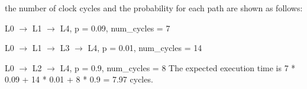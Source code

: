 \begin{problem}
\begin{enumerate}
{\begin{center}
	\end{center}

	the number of clock cycles and the probability for each path are shown as follows:
\item L0 $\rightarrow$ L1 $\rightarrow$ L4, p = 0.09, num\_cycles = 7
\item L0 $\rightarrow$ L1 $\rightarrow$ L3 $\rightarrow$ L4, p = 0.01, num\_cycles = 14
\item L0 $\rightarrow$ L2 $\rightarrow$ L4, p = 0.9, num\_cycles = 8
The expected execution time is 7 * 0.09 + 14 * 0.01 + 8 * 0.9 = 7.97 cycles.
	}
	\end{enumerate}
	
	\end{problem}
	


